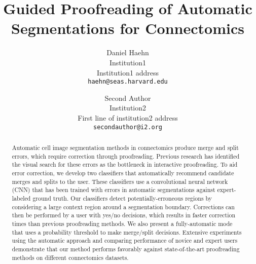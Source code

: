 \documentclass[10pt,twocolumn,letterpaper]{article}
\begin{document}
\title{Guided Proofreading of Automatic Segmentations for Connectomics}

\author{Daniel Haehn\\
Institution1\\
Institution1 address\\
{\tt\small haehn@seas.harvard.edu}
\and
Second Author\\
Institution2\\
First line of institution2 address\\
{\tt\small secondauthor@i2.org}
}

\maketitle

\begin{abstract}
%
Automatic cell image segmentation methods in connectomics produce merge and
split errors, which require correction through proofreading. Previous research
has identified the visual search for these errors as the bottleneck in
interactive proofreading. To aid error correction, we develop two classifiers
that automatically recommend candidate merges and splits to the user. These
classifiers use a convolutional neural network (CNN) that has been trained with
errors in automatic segmentations against expert-labeled ground truth. Our
classifiers detect potentially-erroneous regions by considering a large context
region around a segmentation boundary. Corrections can then be performed by a
user with yes/no decisions,  which results in faster correction times than previous
proofreading methods. We also present a fully-automatic mode that uses a
probability threshold to make merge/split decisions. Extensive experiments using
the automatic approach and comparing performance of novice and expert users
demonstrate that our method performs favorably against state-of-the-art
proofreading methods on different connectomics datasets.
%
\end{abstract}














{\small


}
\end{document}
